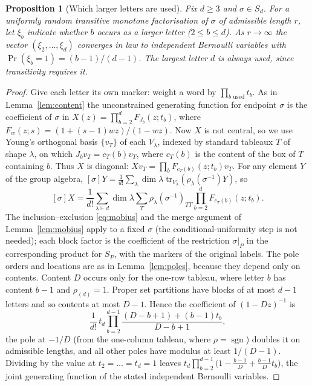 \documentclass[11pt,a4paper]{article}
\newtheorem{proposition}[theorem]{Proposition}
\theoremstyle{definition}\newtheorem{definition}[theorem]{Definition}
\theoremstyle{remark}\newtheorem{remark}[theorem]{Remark}\newtheorem{example}[theorem]{Example}
\DeclareMathOperator{\sgn}{sgn}
\numberwithin{equation}{section}
\begin{document}
\begin{proposition}[Which larger letters are used]\label{pr:occupancy}
Fix $d\ge3$ and $\sigma\in S_d$. For a uniformly random transitive monotone factorisation of $\sigma$ of admissible length $r$, let $\xi_b$ indicate whether $b$ occurs as a larger letter ($2\le b\le d$). As $r\to\infty$ the vector $(\xi_2,\dots,\xi_d)$ converges in law to independent Bernoulli variables with $\Pr(\xi_b=1)=(b-1)/(d-1)$. The largest letter $d$ is always used, since transitivity requires it.
\end{proposition}
\begin{proof}
Give each letter its own marker: weight a word by $\prod_{b\text{ used}}t_b$. As in Lemma~\ref{lem:content} the unconstrained generating function for endpoint $\sigma$ is the coefficient of $\sigma$ in $X(z)=\prod_{b=2}^dF_{J_b}(z;t_b)$, where $F_w(z;s)=(1+(s-1)wz)/(1-wz)$. Now $X$ is not central, so we use Young's orthogonal basis $\{v_T\}$ of each $V_\lambda$, indexed by standard tableaux $T$ of shape $\lambda$, on which $J_bv_T=c_T(b)v_T$, where $c_T(b)$ is the content of the box of $T$ containing $b$. Thus $X$ is diagonal: $Xv_T=\prod_bF_{c_T(b)}(z;t_b)v_T$. For any element $Y$ of the group algebra, $[\sigma]Y=\frac1{d!}\sum_\lambda\dim\lambda\;\mathrm{tr}_{V_\lambda}(\rho_\lambda(\sigma^{-1})Y)$, so
\[
 [\sigma]X=\frac1{d!}\sum_{\lambda\vdash d}\dim\lambda\sum_T\rho_\lambda(\sigma^{-1})_{TT}\prod_{b=2}^dF_{c_T(b)}(z;t_b).
\]
The inclusion--exclusion \eqref{eq:mobius} and the merge argument of Lemma~\ref{lem:mobius} apply to a fixed $\sigma$ (the conditional-uniformity step is not needed); each block factor is the coefficient of the restriction $\sigma|_P$ in the corresponding product for $S_P$, with the markers of the original labels. The pole orders and locations are as in Lemma~\ref{lem:poles}, because they depend only on contents. Content $D$ occurs only for the one-row tableau, where letter $b$ has content $b-1$ and $\rho_{(d)}=1$. Proper set partitions have blocks of at most $d-1$ letters and so contents at most $D-1$. Hence the coefficient of $(1-Dz)^{-1}$ is
\[
 \frac1{d!}\,t_d\prod_{b=2}^{d-1}\frac{(D-b+1)+(b-1)t_b}{D-b+1},
\]
the pole at $-1/D$ (from the one-column tableau, where $\rho=\sgn$) doubles it on admissible lengths, and all other poles have modulus at least $1/(D-1)$. Dividing by the value at $t_2=\dots=t_d=1$ leaves $t_d\prod_{b=2}^{d-1}\bigl(1-\frac{b-1}{D}+\frac{b-1}{D}t_b\bigr)$, the joint generating function of the stated independent Bernoulli variables.
\end{proof}
\end{document}
